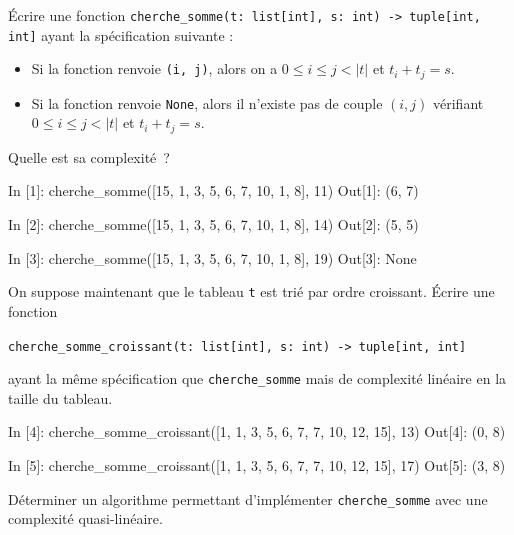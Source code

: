 \documentclass{magnolia}
\begin{document}
\begin{questions}
  \question Écrire une fonction
  \verb!cherche_somme(t: list[int], s: int) -> tuple[int, int]! ayant
  la spécification suivante :
  \begin{itemize}
    \item Si la fonction renvoie \verb!(i, j)!, alors on a
    $0 \leq i \leq j < |t|$ et $t_i + t_j = s$.
    \item Si la fonction renvoie \verb!None!, alors il n'existe pas de
    couple $(i, j)$ vérifiant $0 \leq i \leq j < |t|$ et
    $t_i + t_j = s$.
  \end{itemize}
  Quelle est sa complexité~?
\begin{pythoncode}
In [1]: cherche_somme([15, 1, 3, 5, 6, 7, 10, 1, 8], 11)
Out[1]: (6, 7)

In [2]: cherche_somme([15, 1, 3, 5, 6, 7, 10, 1, 8], 14)
Out[2]: (5, 5)

In [3]: cherche_somme([15, 1, 3, 5, 6, 7, 10, 1, 8], 19)
Out[3]: None
\end{pythoncode}
  \question On suppose maintenant que le tableau \verb!t! est trié par ordre
  croissant. Écrire une fonction
  \begin{center}\verb!cherche_somme_croissant(t: list[int], s: int) -> tuple[int, int]!\end{center} ayant la
  même spécification que \verb!cherche_somme! mais de complexité linéaire en
  la taille du tableau.
\begin{pythoncode}
In [4]: cherche_somme_croissant([1, 1, 3, 5, 6, 7, 7, 10, 12, 15], 13)
Out[4]: (0, 8)

In [5]: cherche_somme_croissant([1, 1, 3, 5, 6, 7, 7, 10, 12, 15], 17)
Out[5]: (3, 8)
\end{pythoncode}
\question Déterminer un algorithme permettant d'implémenter \verb!cherche_somme! avec
une complexité quasi-linéaire.
\end{questions}
\end{document}

